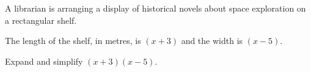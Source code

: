\begin{question}
\noindent A librarian is arranging a display of historical novels about space exploration on a rectangular shelf.

The length of the shelf, in metres, is $(x+3)$ and the width is $(x-5)$.

Expand and simplify $(x+3)(x-5)$.
\vspace{4cm}
\end{question}
